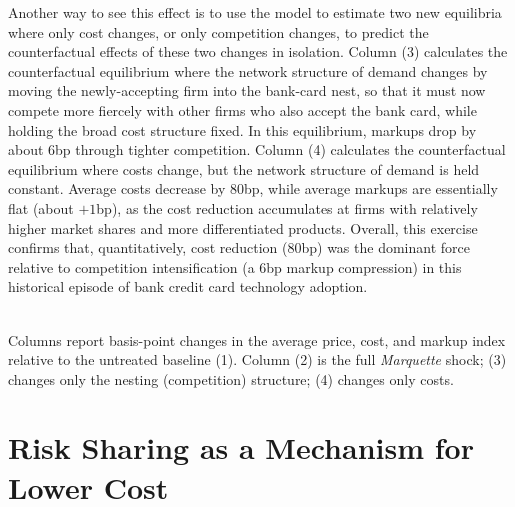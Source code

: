 \documentclass[12pt,english]{article}
\begin{document}
Another way to see this effect is to use the model to estimate two new equilibria where only cost changes, or only competition changes, to predict the counterfactual effects of these two changes in isolation. Column (3) calculates the counterfactual equilibrium where the network structure of demand changes by moving the newly-accepting firm into the bank-card nest, so that it must now compete more fiercely with other firms who also accept the bank card, while holding the broad cost structure fixed. In this equilibrium, markups drop by about 6bp through tighter competition. Column (4) calculates the counterfactual equilibrium where costs change, but the network structure of demand is held constant. Average costs decrease by 80bp, while average markups are essentially flat (about $+1$bp), as the cost reduction accumulates at firms with relatively higher market shares and more differentiated products. Overall, this exercise confirms that, quantitatively, cost reduction (80bp) was the dominant force relative to competition intensification (a 6bp markup compression) in this historical episode of bank credit card technology adoption.

\begin{table}[!htp]
\caption{Decomposing the Effect of Bank Cards}\label{tab:counterfactuals}
    \centering
    
    \\[0.4em] \footnotesize Columns report basis-point changes in the average price, cost, and markup index relative to the untreated baseline (1). Column (2) is the full \emph{Marquette} shock; (3) changes only the nesting (competition) structure; (4) changes only costs.
\end{table}

\section{Risk Sharing as a Mechanism for Lower Cost}\label{sec:cost_reduction}
\end{document}
